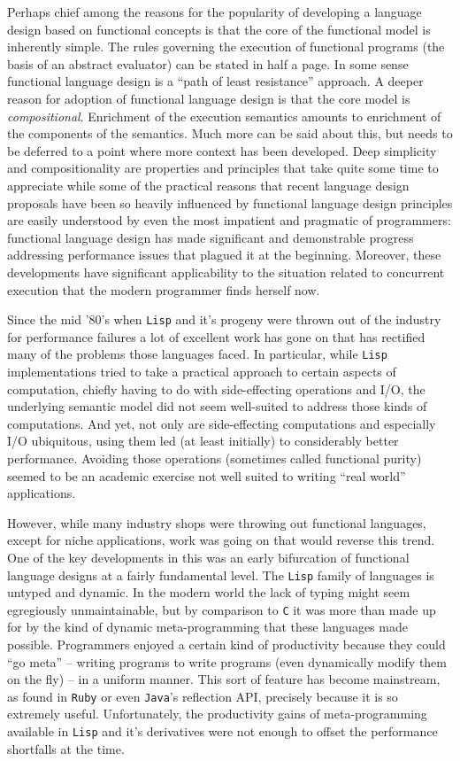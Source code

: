 Perhaps chief among the reasons for the popularity of developing a
language design based on functional concepts is that the core of the
functional model is inherently simple. The rules governing the
execution of functional programs (the basis of an abstract evaluator)
can be stated in half a page. In some sense functional language design
is a ``path of least resistance'' approach. A deeper reason for
adoption of functional language design is that the core model is
\emph{compositional}. Enrichment of the execution semantics amounts to
enrichment of the components of the semantics. Much more can be said
about this, but needs to be deferred to a point where more context has
been developed. Deep simplicity and compositionality are properties
and principles that take quite some time to appreciate while some of
the practical reasons that recent language design proposals have been
so heavily influenced by functional language design principles are
easily understood by even the most impatient and pragmatic of
programmers: functional language design has made significant and
demonstrable progress addressing performance issues that plagued it at
the beginning. Moreover, these developments have significant
applicability to the situation related to concurrent execution that
the modern programmer finds herself now.

Since the mid '80's when \texttt{Lisp} and it's progeny were thrown
out of the industry for performance failures a lot of excellent work
has gone on that has rectified many of the problems those languages
faced. In particular, while \texttt{Lisp} implementations tried to
take a practical approach to certain aspects of computation, chiefly
having to do with side-effecting operations and I/O, the underlying
semantic model did not seem well-suited to address those kinds of
computations. And yet, not only are side-effecting computations and
especially I/O ubiquitous, using them led (at least initially) to
considerably better performance. Avoiding those operations (sometimes
called functional purity) seemed to be an academic exercise not well
suited to writing ``real world'' applications.

However, while many industry shops were throwing out functional
languages, except for niche applications, work was going on that would
reverse this trend. One of the key developments in this was an early
bifurcation of functional language designs at a fairly fundamental
level. The \texttt{Lisp} family of languages is untyped and
dynamic. In the modern world the lack of typing might seem egregiously
unmaintainable, but by comparison to \texttt{C} it was more than made
up for by the kind of dynamic meta-programming that these languages
made possible. Programmers enjoyed a certain kind of productivity
because they could ``go meta'' -- writing programs to write programs
(even dynamically modify them on the fly) -- in a uniform manner. This
sort of feature has become mainstream, as found in \texttt{Ruby} or
even \texttt{Java}'s reflection API, precisely because it is so
extremely useful. Unfortunately, the productivity gains of
meta-programming available in \texttt{Lisp} and it's derivatives were
not enough to offset the performance shortfalls at the time.

